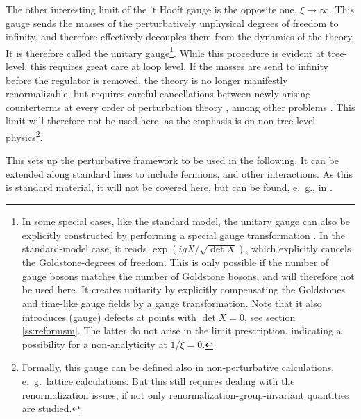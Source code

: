 \documentclass[final,12pt]{article}
\newcommand*{\1}{1\!\!\!\bot}
\begin{document}
The other interesting limit of the 't Hooft gauge is the opposite one, $\xi\to\infty$. This gauge sends the masses of the perturbatively unphysical degrees of freedom to infinity, and therefore effectively decouples them from the dynamics of the theory. It is therefore called the unitary gauge\footnote{In some special cases, like the standard model, the unitary gauge can also be explicitly constructed by performing a special gauge transformation \cite{Bohm:2001yx}. In the standard-model case, it reads $\exp(ig X/\sqrt{\det X})$, which explicitly cancels the Goldstone-degrees of freedom. This is only possible if the number of gauge bosons matches the number of Goldstone bosons, and will therefore not be used here. It creates unitarity by explicitly compensating the Goldstones and time-like gauge fields by a gauge transformation. Note that it also introduces (gauge) defects at points with $\det X=0$, see section \ref{ss:reformsm}. The latter do not arise in the limit prescription, indicating a possibility for a non-analyticity at $1/\xi=0$.}. While this procedure is evident at tree-level, this requires great care at loop level. If the masses are send to infinity before the regulator is removed, the theory is no longer manifestly renormalizable, but requires careful cancellations between newly arising counterterms at every order of perturbation theory \cite{Bohm:2001yx,Weinberg:1971fb,Lee:1973fw,Lee:1973xp,Appelquist:1972tn,Irges:2017ztc}, among other problems \cite{Bohm:2001yx,Bars:1972pe,Jackiw:1972jz}. This limit will therefore not be used here, as the emphasis is on non-tree-level physics\footnote{Formally, this gauge can be defined also in non-perturbative calculations, e.\ g.\ lattice calculations. But this still requires dealing with the renormalization issues, if not only renormalization-group-invariant quantities are studied.}.

This sets up the perturbative framework to be used in the following. It can be extended along standard lines to include fermions, and other interactions. As this is standard material, it will not be covered here, but can be found, e.\ g., in \cite{Bohm:2001yx,Barbieri:2007gi,O'Raifeartaigh:1986vq,Branco:2011iw,Langacker:1980js,Morrissey:2009tf}.
\end{document}

